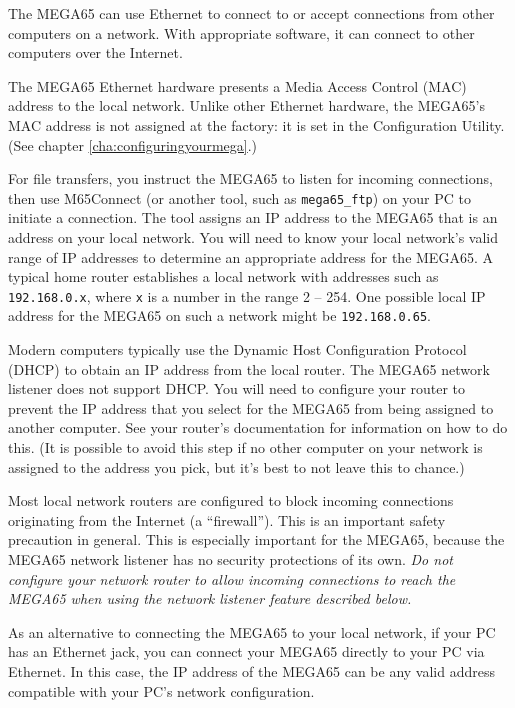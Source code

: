 The MEGA65 can use Ethernet to connect to or accept connections from other computers on a network. With appropriate software, it can connect to other computers over the Internet.

The MEGA65 Ethernet hardware presents a Media Access Control (MAC) address to the local network. Unlike other Ethernet hardware, the MEGA65's MAC address is not assigned at the factory: it is set in the Configuration Utility. (See chapter \vref{cha:configuringyourmega}.)

For file transfers, you instruct the MEGA65 to listen for incoming connections, then use M65Connect (or another tool, such as \texttt{mega65\_ftp}) on your PC to initiate a connection. The tool assigns an IP address to the MEGA65 that is an address on your local network. You will need to know your local network's valid range of IP addresses to determine an appropriate address for the MEGA65. A typical home router establishes a local network with addresses such as \texttt{192.168.0.x}, where \texttt{x} is a number in the range 2 -- 254. One possible local IP address for the MEGA65 on such a network might be \texttt{192.168.0.65}.


Modern computers typically use the Dynamic Host Configuration Protocol (DHCP) to obtain an IP address from the local router. The MEGA65 network listener does not support DHCP. You will need to configure your router to prevent the IP address that you select for the MEGA65 from being assigned to another computer. See your router's documentation for information on how to do this. (It is possible to avoid this step if no other computer on your network is assigned to the address you pick, but it's best to not leave this to chance.)

Most local network routers are configured to block incoming connections originating from the Internet (a ``firewall''). This is an important safety precaution in general. This is especially important for the MEGA65, because the MEGA65 network listener has no security protections of its own. {\em Do not configure your network router to allow incoming connections to reach the MEGA65 when using the network listener feature described below.}


As an alternative to connecting the MEGA65 to your local network, if your PC has an Ethernet jack, you can connect your MEGA65 directly to your PC via Ethernet. In this case, the IP address of the MEGA65 can be any valid address compatible with your PC's network configuration.

